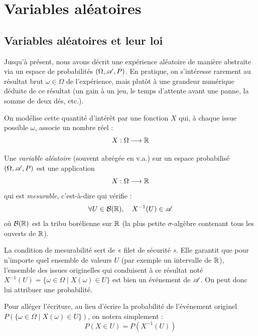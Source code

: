 \chapter{Variables aléatoires}

\section{Variables aléatoires et leur loi}

Jusqu'à présent, nous avons décrit une expérience aléatoire de manière abstraite via un espace de probabilités $(\Omega, \mathscr{A}, P)$. En pratique, on s'intéresse rarement au résultat brut $\omega \in \Omega$ de l'expérience, mais plutôt à une grandeur numérique déduite de ce résultat (un gain à un jeu, le temps d'attente avant une panne, la somme de deux dés, etc.). 

On modélise cette quantité d'intérêt par une fonction $X$ qui, à chaque issue possible $\omega$, associe un nombre réel :
\[
X : \Omega \longrightarrow \mathbb{R}
\]

\begin{definition}
    Une \emph{variable aléatoire} (souvent abrégée en v.a.) sur un espace probabilisé $(\Omega, \mathscr{A}, P)$ est une application
    \[
    X : \Omega \longrightarrow \mathbb{R}
    \]
    qui est \emph{mesurable}, c'est-à-dire qui vérifie :
    \[
    \forall U \in \mathcal{B}(\mathbb{R}), \quad X^{-1}(U) \in \mathscr{A}
    \]
    où $\mathcal{B}(\mathbb{R})$ est la tribu borélienne sur $\mathbb{R}$ (la plus petite $\sigma$-algèbre contenant tous les ouverts de $\mathbb{R}$).
\end{definition}

\begin{remarque}
    La condition de mesurabilité sert de « filet de sécurité ». Elle garantit que pour n'importe quel ensemble de valeurs $U$ (par exemple un intervalle de $\mathbb{R}$), l'ensemble des issues originelles qui conduisent à ce résultat  noté $X^{-1}(U) = \{\omega \in \Omega \mid X(\omega) \in U\}$  est bien un événement de $\mathscr{A}$. On peut donc lui attribuer une probabilité.
\end{remarque}

\begin{notation}
    Pour alléger l'écriture, au lieu d'écrire la probabilité de l'événement originel $P(\{\omega \in \Omega \mid X(\omega) \in U\})$, on notera simplement :
    \[
    P(X \in U) = P\!\left(X^{-1}(U)\right)
    \]
\end{notation}

